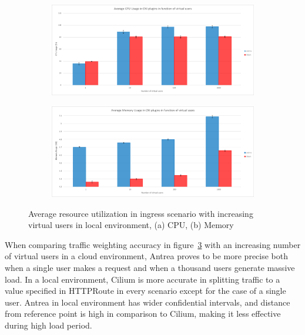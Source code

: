 \begin{figure}[H]
    \centering
    \begin{subfigure}[b]{0.8\textwidth}
        \includegraphics[width=\textwidth]{plots/traffic-splitting/cpu_local.png}
        \caption{}
        \label{fig:cpu_local_avg}
    \end{subfigure}
    \begin{subfigure}[b]{0.8\textwidth}
        \includegraphics[width=\textwidth]{plots/traffic-splitting/memory_local.png}
        \caption{}
        \label{fig:memory_local_avg}
    \end{subfigure}
    
    \caption{Average resource utilization in ingress scenario with increasing virtual users in local environment, (a) CPU, (b) Memory}
    \label{fig:resource_local_avg}
\end{figure}

When comparing traffic weighting accuracy in figure~\ref{fig:resource_local_avg} with an increasing number of virtual users in a cloud environment, Antrea proves to be more precise both when a single user makes a request and when a thousand users generate massive load. In a local environment, Cilium is more accurate in splitting traffic to a value specified in HTTPRoute in every scenario except for the case of a single user. Antrea in local environment has wider confidential intervals, and distance from reference point is high in comparison to Cilium, making it less effective during high load period.


